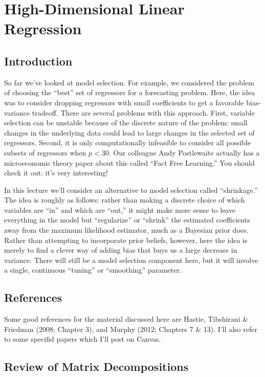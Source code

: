 \chapter{High-Dimensional Linear Regression}
\section{Introduction}
So far we've looked at model selection. For example, we considered the problem of choosing the ``best'' set of regressors for a forecasting problem. Here, the idea was to consider dropping regressors with small coefficients to get a favorable bias-variance tradeoff. There are several problems with this approach. First, variable selection can be unstable because of the discrete nature of the problem: small changes in the underlying data could lead to large changes in the selected set of regressors. Second, it is only computationally infeasible to consider all possible subsets of regressors when $p < 30$. Our colleague Andy Postlewaite actually has a microeconomic theory paper about this called ``Fact Free Learning.'' You should check it out: it's very interesting!

In this lecture we'll consider an alternative to model selection called ``shrinkage.'' The idea is roughly as follows: rather than making a discrete choice of which variables are ``in'' and which are ``out,'' it might make more sense to leave everything in the model but ``regularize'' or ``shrink'' the estimated coefficients away from the maximum likelihood estimator, much as a Bayesian prior does. Rather than attempting to incorporate prior beliefs, however, here the idea is merely to find a clever way of adding bias that buys us a large decrease in variance. There will still be a model selection component here, but it will involve a single, continuous ``tuning'' or ``smoothing'' parameter.

\section{References}
Some good references for the material discussed here are Hastie, Tibshirani \& Friedman (2008; Chapter 3), and Murphy (2012; Chapters 7 \& 13). I'll also refer to some specifid papers which I'll post on Canvas.

\section{Review of Matrix Decompositions}
